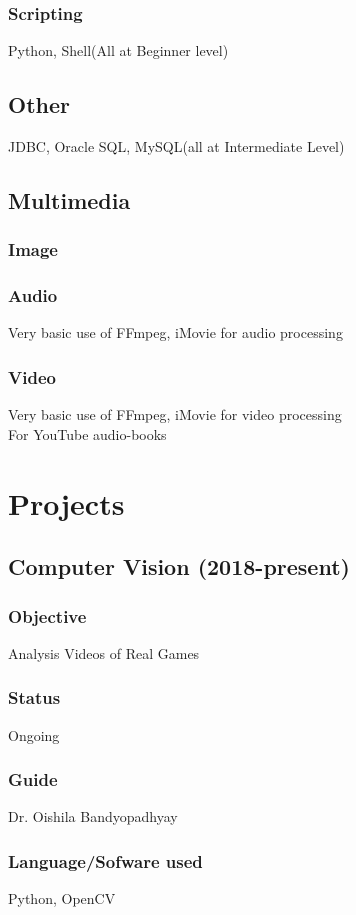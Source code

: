 \documentclass{article}
\begin{document}
\subsubsection{Scripting}
Python, Shell(All at Beginner level)

\subsection{Other}
JDBC, Oracle SQL, MySQL(all at Intermediate Level)

\subsection{Multimedia}
\subsubsection{Image}
\subsubsection{Audio}
Very basic use of FFmpeg, iMovie for audio processing
\subsubsection{Video}
Very basic use of FFmpeg, iMovie for video processing\\For YouTube audio-books

\section{Projects}
\subsection{Computer Vision (2018-present)}
\subsubsection{Objective} Analysis Videos of Real Games
\subsubsection{Status} Ongoing
\subsubsection{Guide} Dr. Oishila Bandyopadhyay
\subsubsection{Language/Sofware used} Python, OpenCV
\end{document}
